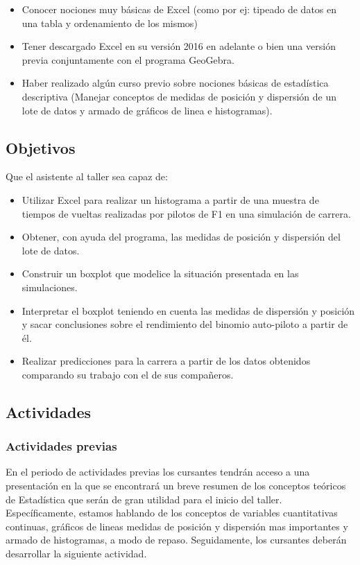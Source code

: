 \begin{itemize}
	\item Conocer nociones muy básicas de Excel (como por ej: tipeado de datos en una tabla y ordenamiento de los mismos)
	\item Tener descargado Excel en su versión 2016 en adelante o bien una versión previa conjuntamente con el programa GeoGebra.
	\item Haber realizado algún curso previo sobre nociones básicas de estadística descriptiva (Manejar conceptos de medidas de posición y dispersión de un lote de datos y armado de gráficos de linea e histogramas).
\end{itemize}

\subsection{Objetivos}

Que el asistente al taller sea capaz de: 
\begin{itemize}
	\item Utilizar Excel para realizar un histograma a partir de una muestra de tiempos de vueltas realizadas por pilotos de F1 en una simulación de carrera.
	\item Obtener, con ayuda del programa, las medidas de posición y dispersión del lote de datos.
	\item Construir un boxplot que modelice la situación presentada en las simulaciones. 
	\item Interpretar el boxplot teniendo en cuenta las medidas de dispersión y posición y sacar conclusiones sobre el rendimiento del binomio auto-piloto a partir de él.
	\item Realizar predicciones para la carrera a partir de los datos obtenidos comparando su trabajo con el de sus compañeros. 
\end{itemize}

\subsection{Actividades}

\subsubsection{Actividades previas}

En el periodo de actividades previas los cursantes tendrán acceso a una presentación en la que se encontrará un breve resumen de los conceptos teóricos de Estadística que serán de gran utilidad para el inicio del taller. Específicamente, estamos hablando de los conceptos de variables cuantitativas continuas, gráficos de lineas medidas de posición y dispersión mas importantes y armado de histogramas, a modo de repaso. Seguidamente, los cursantes deberán desarrollar la siguiente actividad. 

